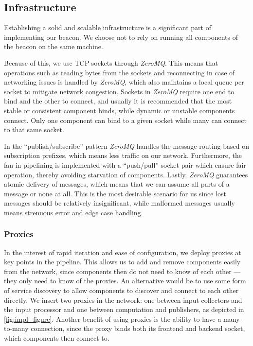 \subsection{Infrastructure}%
\label{sub:infrastructure}
Establishing a solid and scalable infrastructure is a significant part of implementing our beacon.
We choose not to rely on running all components of the beacon on the same machine.

Because of this, we use TCP sockets through \textit{ZeroMQ}.
This means that operations such as reading bytes from the sockets and reconnecting in case of networking issues is handled by \textit{ZeroMQ}, which also maintains a local queue per socket to mitigate network congestion.
Sockets in \textit{ZeroMQ} require one end to bind and the other to connect, and usually it is recommended that the most stable or consistent component binds, while dynamic or unstable components connect.
Only one component can bind to a given socket while many can connect to that same socket.

In the \enquote{publish/subscribe} pattern \textit{ZeroMQ} handles the message routing based on subscription prefixes, which means less traffic on our network.
Furthermore, the fan-in pipelining is implemented with a \enquote{push/pull} socket pair which ensure fair operation, thereby avoiding starvation of components.
Lastly, \textit{ZeroMQ} guarantees atomic delivery of messages, which means that we can assume all parts of a message or none at all. This is the most desirable scenario for us since lost messages should be relatively insignificant, while malformed messages usually means strenuous error and edge case handling.

\subsubsection{Proxies}
In the interest of rapid iteration and ease of configuration, we deploy proxies at key points in the pipeline.
This allows us to add and remove components easily from the network, since components then do not need to know of each other --- they only need to know of the proxies.
An alternative would be to use some form of service discovery to allow components to discover and connect to each other directly.
We insert two proxies in the network: one between input collectors and the input processor and one between computation and publishers, as depicted in \vref{fig:impl_figure}.
Another benefit of using proxies is the ability to have a many-to-many connection, since the proxy binds both its frontend and backend socket, which components then connect to.

